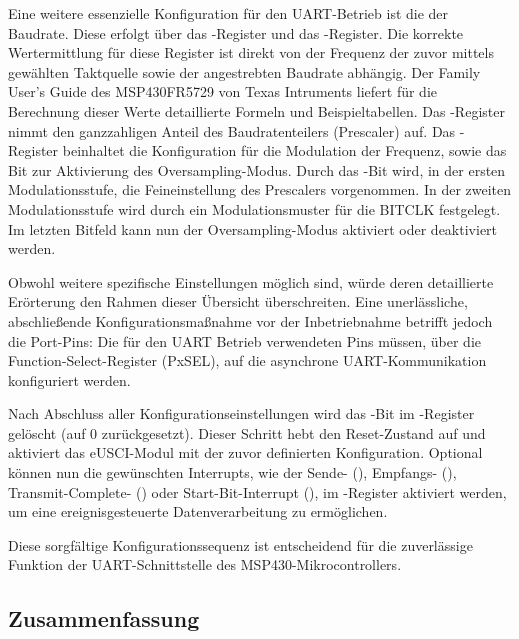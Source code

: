 Eine weitere essenzielle Konfiguration f\"ur den UART-Betrieb ist die der Baudrate. Diese erfolgt \"uber das -Register und das -Register. Die korrekte Wertermittlung f\"ur diese Register ist direkt von der Frequenz der zuvor mittels  gew\"ahlten Taktquelle sowie der angestrebten Baudrate abh\"angig. Der Family User's Guide des MSP430FR5729 von Texas Intruments liefert f\"ur die Berechnung dieser Werte detaillierte Formeln und Beispieltabellen. Das -Register nimmt den ganzzahligen Anteil des Baudratenteilers (Prescaler) auf. Das -Register beinhaltet die Konfiguration f\"ur die Modulation der Frequenz, sowie das Bit zur Aktivierung des Oversampling-Modus. Durch das -Bit wird, in der ersten Modulationsstufe, die Feineinstellung des Prescalers vorgenommen. In der zweiten Modulationsstufe wird durch  ein Modulationsmuster f\"ur die BITCLK festgelegt. Im letzten Bitfeld kann nun der Oversampling-Modus aktiviert oder deaktiviert werden.

Obwohl weitere spezifische Einstellungen m\"oglich sind, w\"urde deren detaillierte Er\"orterung den Rahmen dieser \"Ubersicht \"uberschreiten. Eine unerl\"assliche, abschließende Konfigurationsmaßnahme vor der Inbetriebnahme betrifft jedoch die Port-Pins: Die f\"ur den UART Betrieb verwendeten Pins m\"ussen, \"uber die Function-Select-Register (PxSEL), auf die asynchrone UART-Kommunikation konfiguriert werden. 

Nach Abschluss aller Konfigurationseinstellungen wird das -Bit im -Register gel\"oscht (auf 0 zur\"uckgesetzt). Dieser Schritt hebt den Reset-Zustand auf und aktiviert das eUSCI-Modul mit der zuvor definierten Konfiguration. Optional k\"onnen nun die gew\"unschten Interrupts, wie \zB der Sende- (), Empfangs- (), Transmit-Complete- () oder Start-Bit-Interrupt (), im -Register aktiviert werden, um eine ereignisgesteuerte Datenverarbeitung zu erm\"oglichen. 
	
Diese sorgf\"altige Konfigurationssequenz ist entscheidend f\"ur die zuverl\"assige Funktion der UART-Schnittstelle des MSP430-Mikrocontrollers.

\subsection{Zusammenfassung}
\label{eUSCI_Zusammenfassung}

